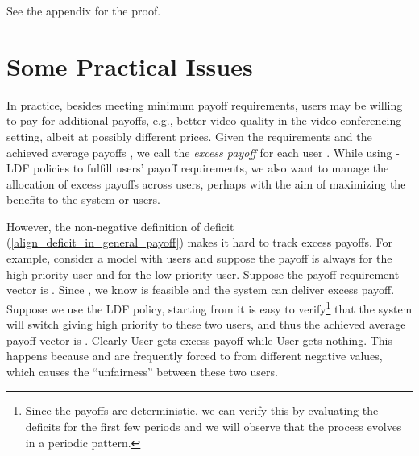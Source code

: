\documentclass[prodmode,acmtompecs]{acmsmall}
\newcommand{\myComments}[1]{}
\newif\ifdissertation
\newcommand{\dissertationStart}{\ifdissertation  \myComments{Dissertation version: }}
\newcommand{\commentEnd}{\myComments{End}}
\begin{document}
See the appendix for the proof. 
\commentEnd\fi

\dissertationStart
This subsection should also go to dissertation, probably with the following paragraph. 

This SRMW model is a generalized version of the system model in \cite{HoK12}. The work in \cite{HoK12} studies a discrete-time wireless model where  users are competing to transmit a packet to the server at each period of length  time slots. The deadlines of the packets are the end of the period. If user  is scheduled at a time slot, it successfully transmits the packet with probability  and will re-transmit if it fails until the period ends. Therefore, the workload, i.e., the time to successfully transmit a packet from user  is a geometric random variable with success parameter . In \cite{HoK12} they show that LDF is feasibility optimal.
\commentEnd\fi


\section{Some Practical Issues}
In practice, besides meeting minimum payoff requirements, users may be willing to pay for additional payoffs, e.g., better video quality in the video conferencing setting, albeit at possibly different prices. 
Given the requirements  and the achieved average payoffs , we call  the {\em excess payoff} for each user . While using -LDF policies to fulfill users' payoff requirements, we also want to manage the allocation of excess payoffs across users, perhaps with the aim of maximizing the benefits to the system or users. 

However, the non-negative definition of deficit (\ref{align_deficit_in_general_payoff}) makes it hard to track excess payoffs. For example, consider a model with  users and suppose the payoff is always  for the high priority user and  for the low priority user. 
Suppose the payoff requirement vector is . Since , we know  is feasible and the system can deliver  excess payoff. 
Suppose we use the LDF policy, starting from  it is easy to verify\footnote{Since the payoffs are deterministic, we can verify this by evaluating the deficits for the first few periods and we will observe that the process  evolves in a periodic pattern. } that the system will switch giving high priority to these two users, and thus the achieved average payoff vector is . Clearly User  gets  excess payoff while User  gets nothing. 
This happens because  and  are frequently forced to  from different negative values, which causes the ``unfairness'' between these two users. 
\end{document}
